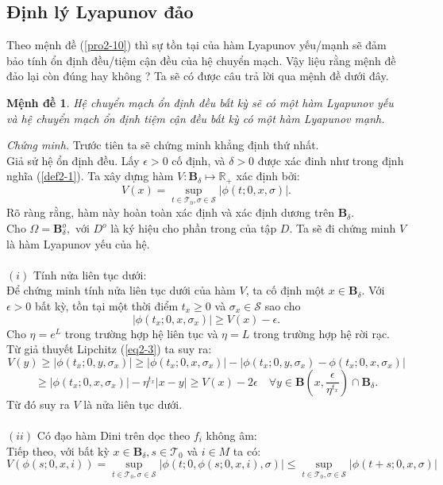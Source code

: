 \documentclass[14pt,a4paper,oneside]{report}		%
\newtheorem{proposition}[theorem]{Mệnh đề}
\theoremstyle{definition}
\begin{document}
\subsection{Định lý Lyapunov đảo}
Theo mệnh đề (\ref{pro2-10}) thì sự tồn tại của hàm Lyapunov yếu/mạnh sẽ đảm bảo tính ổn định đều/tiệm cận đều của hệ chuyển mạch. Vậy liệu rằng mệnh đề đảo lại còn đúng hay không ? Ta sẽ có được câu trả lời qua mệnh đề dưới đây.
\begin{proposition} \label{pro2-11}
Hệ chuyển mạch ổn định đều bất kỳ sẽ có một hàm Lyapunov yếu và hệ chuyển mạch ổn định tiệm cận đều bất kỳ có một hàm Lyapunov mạnh.
\end{proposition}
\textit{Chứng minh.} Trước tiên ta sẽ chứng minh khẳng định thứ nhất.\\
Giả sử hệ ổn định đều. Lấy $\epsilon >0$ cố định, và $\delta >0$ được xác đinh như trong định nghĩa (\ref{def2-1}). Ta xây dựng hàm $V:\mathbf{B}_\delta\mapsto\mathbb{R}_+$ xác định bởi:
\begin{equation} \label{eq2-13}
V(x) = \sup_{t\in\mathcal{T}_0,\sigma\in\mathcal{S}}|\phi(t;0,x,\sigma)|.
\end{equation}
Rõ ràng rằng, hàm này hoàn toàn xác định và xác định dương trên $\mathbf{B}_\delta.$\\
Cho $\Omega=\mathbf{B}_\delta^o,$ với $D^o$ là ký hiệu cho phần trong của tập $D$. Ta sẽ đi chứng minh $V$ là hàm Lyapunov yếu của hệ.\\\\
$(i)$ Tính nửa liên tục dưới:\\
Để chứng minh tính nửa liên tục dưới của hàm $V$, ta cố định một $x\in\mathbf{B}_\delta.$ Với $\epsilon >0$ bất kỳ, tồn tại một thời điểm $t_x\geq 0$ và $\sigma_x\in\mathcal{S}$ sao cho
$$|\phi(t_x;0,x,\sigma_x)|\geq V(x)-\epsilon.$$
Cho $\eta = e^L$ trong trường hợp hệ liên tục và $\eta = L$ trong trường hợp hệ rời rạc. Từ giả thuyết Lipchitz (\ref{eq2-3}) ta suy ra:
$$V(y)\geq |\phi(t_x;0,y,\sigma_x)|\geq|\phi(t_x;0,x,\sigma_x)|-|\phi(t_x;0,y,\sigma_x)-\phi(t_x;0,x,\sigma_x)|$$
$$\geq |\phi(t_x;0,x,\sigma_x)|-\eta^{t_x}|x-y|\geq V(x)-2\epsilon\quad\forall y\in\mathbf{B}(x,\frac{\epsilon}{\eta^{t_x}})\cap\mathbf{B}_\delta.$$
Từ đó suy ra $V$ là nửa liên tục dưới.\\\\
$(ii)$ Có đạo hàm Dini trên dọc theo $f_i$ không âm:\\
Tiếp theo, với bất kỳ $x\in\mathbf{B}_\delta, s\in\mathcal{T}_0$ và $i\in M$ ta có:
$$V(\phi(s;0,x,i))=\sup_{t\in\mathcal{T}_0,\sigma\in\mathcal{S}}|\phi(t;0,\phi(s;0,x,i),\sigma)|\leq\sup_{t\in\mathcal{T}_0,\sigma\in\mathcal{S}}|\phi(t+s;0,x,\sigma)|$$
\end{document}
